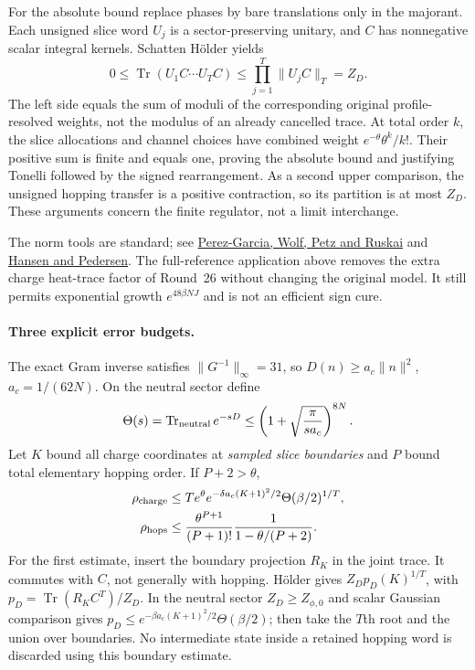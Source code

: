 For the absolute bound replace phases by bare translations only in the
majorant. Each unsigned slice word $U_j$ is a sector-preserving unitary,
and $C$ has nonnegative scalar integral kernels. Schatten H\"older yields
\[
 0\le\operatorname{Tr}(U_1C\cdots U_TC)
 \le\prod_{j=1}^T\|U_jC\|_T=Z_D.
\]
The left side equals the sum of moduli of the corresponding original
profile-resolved weights, not the modulus of an already cancelled trace.
At total order $k$, the slice allocations and channel choices have combined
weight $e^{-\theta}\theta^k/k!$. Their positive sum is finite and equals
one, proving the absolute bound and justifying Tonelli followed by the
signed rearrangement. As a second upper comparison, the unsigned hopping
transfer is a positive contraction, so its partition is at most $Z_D$.
These arguments concern the finite regulator, not a limit interchange.

The norm tools are standard; see
\href{https://arxiv.org/abs/math-ph/0601063}{Perez-Garcia, Wolf, Petz and Ruskai}
and \href{https://arxiv.org/abs/math/0204049}{Hansen and Pedersen}.
The full-reference application above removes the extra charge heat-trace
factor of Round~26 without changing the original model. It still permits
exponential growth $e^{48\beta NJ}$ and is not an efficient sign cure.

\paragraph{Three explicit error budgets.}
The exact Gram inverse satisfies $\|G^{-1}\|_\infty=31$, so
$D(n)\ge a_c\|n\|^2$, $a_c=1/(62N)$. On the neutral sector define
\[
 \Theta(s)=\operatorname{Tr}_{\rm neutral}e^{-sD}
 \le\left(1+\sqrt{\frac{\pi}{s a_c}}\right)^{8N}.
\]
Let $K$ bound all charge coordinates at \emph{sampled slice boundaries}
and $P$ bound total elementary hopping order. If $P+2>\theta$,
\[
 \begin{aligned}
 \rho_{\rm charge}&\le T e^\theta
   e^{-\delta a_c(K+1)^2/2}\Theta(\beta/2)^{1/T},\\
 \rho_{\rm hops}&\le
  \frac{\theta^{P+1}}{(P+1)!}\frac1{1-\theta/(P+2)}.
 \end{aligned}
\]
For the first estimate, insert the boundary projection $R_K$ in the
joint trace. It commutes with $C$, not generally with hopping. H\"older
gives $Z_Dp_D(K)^{1/T}$, with $p_D=\operatorname{Tr}(R_KC^T)/Z_D$.
In the neutral sector $Z_D\ge Z_{\phi,0}$ and scalar Gaussian comparison
gives $p_D\le e^{-\beta a_c(K+1)^2/2}\Theta(\beta/2)$; then take the
$T$th root and the union over boundaries. No intermediate state inside
a retained hopping word is discarded using this boundary estimate.

